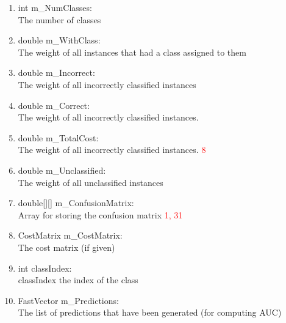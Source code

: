 \documentclass[a4paper,12pt]{article}
\begin{document}
\begin{enumerate}
  \item int m\_NumClasses: \\  The number of classes
  
  \item double m\_WithClass: \\ The weight of all instances that had a class assigned to them

  \item double m\_Incorrect: \\  The weight of all incorrectly classified instances

  \item double m\_Correct: \\  The weight of all incorrectly classified instances.
  	
  \item double m\_TotalCost: \\  The weight of all incorrectly classified instances. \textcolor{red}{8}

  \item double m\_Unclassified: \\ The weight of all unclassified instances

  \item double[][] m\_ConfusionMatrix: \\ Array for storing the confusion matrix \textcolor{red}{1, 31} 
  
  \item CostMatrix m\_CostMatrix: \\ The cost matrix (if given)
    
  \item int classIndex: \\ classIndex the index of the class
  
  \item FastVector m\_Predictions: \\ The list of predictions that have been generated (for computing AUC)
  

\end{enumerate}
\end{document}

